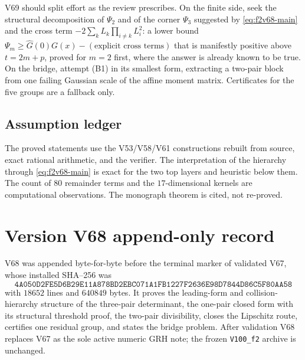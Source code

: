 \documentclass[11pt]{article}
\theoremstyle{definition}
\theoremstyle{remark}
\begin{document}
V69 should split effort as the review prescribes.  On the finite side,
seek the structural decomposition of \(\Psi_2\) and of the corner
\(\Psi_3\) suggested by \eqref{eq:f2v68-main} and the cross term
\(-2\sum_kL_k\prod_{i\ne k}L_i^2\): a lower bound
\(\Psi_m\ge\widehat G(0)G(x)-(\text{explicit cross terms})\) that is
manifestly positive above \(t=2m+p\), proved for \(m=2\) first, where the
answer is already known to be true.  On the bridge, attempt (B1) in its
smallest form, extracting a two-pair block from one failing Gaussian
scale of the affine moment matrix.  Certificates for the five groups are
a fallback only.

\subsection*{Assumption ledger}
\label{ass:f2v68}
The proved statements use the V53/V58/V61 constructions rebuilt from
source, exact rational arithmetic, and the verifier.  The interpretation
of the hierarchy through \eqref{eq:f2v68-main} is exact for the two top
layers and heuristic below them.  The count of \(80\) remainder terms and
the \(17\)-dimensional kernels are computational observations.  The
monograph theorem is cited, not re-proved.
\endgroup

\section*{Version V68 append-only record}

V68 was appended byte-for-byte before the terminal marker of validated
V67, whose installed SHA--256 was
\[
 \texttt{4A050D2FE5D6B29E11A878BD2EBC071A}
 \allowbreak\texttt{1FB1227F2636E98D7844D86C5F80AA58}
\]
with \(18652\) lines and \(640849\) bytes.  It proves the leading-form
and collision-hierarchy structure of the three-pair determinant, the
one-pair closed form with its structural threshold proof, the two-pair
divisibility, closes the Lipschitz route, certifies one residual group,
and states the bridge problem.  After validation V68 replaces V67 as the
sole active numeric GRH note; the frozen \texttt{V100\_f2} archive is
unchanged.





\clearpage
\end{document}
